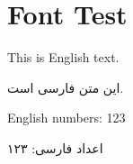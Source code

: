 \documentclass[12pt,a4paper]{article}
\newcommand{\fa}[1]{\textfarsi{#1}}
\newcommand{\eng}[1]{\textenglish{#1}}
\begin{document}
\section*{Font Test}

\eng{This is English text.}

\fa{این متن فارسی است.}

\eng{English numbers: 123}

\fa{اعداد فارسی: ۱۲۳}
\end{document}
